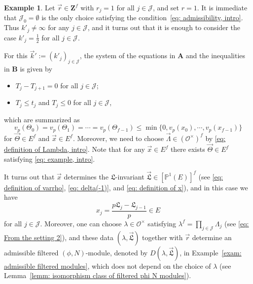 \documentclass[11pt]{amsart}
\theoremstyle{definition}
\numberwithin{equation}{subsection}
\theoremstyle{plain}
\theoremstyle{plain}
\theoremstyle{plain}
\theoremstyle{plain}
\theoremstyle{plain}
\theoremstyle{plain}
\theoremstyle{plain}
\theoremstyle{plain}
\theoremstyle{plain}
\theoremstyle{plain}
\theoremstyle{plain}
\theoremstyle{plain}
\theoremstyle{definition}
\theoremstyle{definition}
\theoremstyle{definition}
\newtheorem{exam}[equation]{Example}
\theoremstyle{remark}
\renewcommand{\(}{\textup{(}}
\renewcommand{\)}{\textup{)}}
\newcommand{\Z}{\mathbf{Z}}
\newcommand{\fL}{\mathfrak{L}}
\newcommand{\cO}{\mathcal{O}}
\newcommand{\cJ}{\mathcal{J}}
\newcommand{\vx}{\vec{x}}
\newcommand{\vr}{\vec{r}}
\newcommand{\vL}{\vec{\fL}}
\newcommand{\vk}{\vec{k}}
\newcommand{\vLam}{\vec{\Lambda}}
\newcommand{\vTh}{\vec{\Theta}}
\begin{document}
\begin{exam}
Let $\vr\in\Z^f$ with $r_j=1$ for all $j\in\cJ$, and set $r=1$. It is immediate that $\cJ_0=\emptyset$ is the only choice satisfying the condition~\eqref{eq: admissibility, intro}. Thus $k'_j\neq \infty$ for any $j\in\cJ$, and it turns out that it is enough to consider the case $k'_j=\frac{1}{2}$ for all $j\in\cJ$.

For this $\vk':=(k'_j)_{j\in\cJ}$, the system of the equations in \textbf{A} and the inequalities in \textbf{B} is given by
\begin{itemize}[leftmargin=*]
  \item $T_j-T_{j+1}=0$ for all $j\in\cJ$;
  \item $T_j\leq t_j$ and $T_j\leq 0$ for all $j\in\cJ$,
\end{itemize}
which are summarized as
\begin{equation}\label{eq: example, intro}
v_p(\Theta_0)=v_p(\Theta_1)=\cdots=v_p(\Theta_{f-1})\leq \min\{0,v_p(x_0),\cdots,v_p(x_{f-1})\}
\end{equation}
for $\vTh\in E^f$ and $\vx\in E^f$. Moreover, we need to choose $\vLam\in (\cO^\times)^f$ by \eqref{eq: definition of Lambda, intro}. Note that for any $\vx\in E^f$ there exists $\vTh\in E^f$ satisfying \eqref{eq: example, intro}.

It turns out that $\vx$ determines the $\fL$-invariant $\vL\in [\mathbb{P}^1(E)]^f$ (see \eqref{eq: definition of varrho}, \eqref{eq: delta(-1)}, and \eqref{eq: definition of x}), and in this case we have $$x_j=\frac{p\fL_j-\fL_{j-1}}{p}\in E$$
for all $j\in\cJ$. Moreover, one can choose $\lambda\in\cO^\times$ satisfying $\lambda^f=\prod_{j\in\cJ}\Lambda_j$ (see \eqref{eq: From the setting 2}), and these data $(\lambda,\vL)$ together with $\vr$ determine an admissible filtered $(\phi,N)$-module, denoted by $D(\lambda,\vL)$, in Example~\ref{exam: admissible filtered modules}, which does not depend on the choice of $\lambda$ (see Lemma~\ref{lemm: isomorphism class of filtered phi N modules}).


\end{exam}
\end{document}
